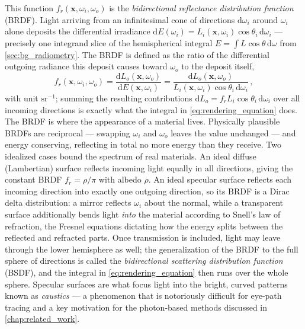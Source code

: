 This function $f_r(\mathbf{x}, \omega_i, \omega_o)$ is the \emph{bidirectional reflectance distribution function} (BRDF). Light arriving from an infinitesimal cone of directions $\mathrm{d}\omega_i$ around $\omega_i$ alone deposits the differential irradiance $\mathrm{d}E(\omega_i) = L_i(\mathbf{x}, \omega_i)\cos\theta_i \,\mathrm{d}\omega_i$ --- precisely one integrand slice of the hemispherical integral $E = \int L\cos\theta \,\mathrm{d}\omega$ from \cref{sec:bg_radiometry}. The BRDF is defined as the ratio of the differential outgoing radiance this deposit causes toward $\omega_o$ to the deposit itself,
\begin{equation}
	f_r(\mathbf{x}, \omega_i, \omega_o) = \frac{\mathrm{d}L_o(\mathbf{x}, \omega_o)}{\mathrm{d}E(\mathbf{x}, \omega_i)} = \frac{\mathrm{d}L_o(\mathbf{x}, \omega_o)}{L_i(\mathbf{x}, \omega_i)\cos\theta_i \,\mathrm{d}\omega_i} \,,
\end{equation}
with unit $\mathrm{sr^{-1}}$; summing the resulting contributions $\mathrm{d}L_o = f_r L_i \cos\theta_i \,\mathrm{d}\omega_i$ over all incoming directions is exactly what the integral in \cref{eq:rendering_equation} does. The BRDF is where the appearance of a material lives. Physically plausible BRDFs are reciprocal --- swapping $\omega_i$ and $\omega_o$ leaves the value unchanged --- and energy conserving, reflecting in total no more energy than they receive. Two idealized cases bound the spectrum of real materials. An ideal diffuse (Lambertian) surface reflects incoming light equally in all directions, giving the constant BRDF $f_r = \rho/\pi$ with albedo $\rho$. An ideal specular surface reflects each incoming direction into exactly one outgoing direction, so its BRDF is a Dirac delta distribution: a mirror reflects $\omega_i$ about the normal, while a transparent surface additionally bends light \emph{into} the material according to Snell's law of refraction, the Fresnel equations dictating how the energy splits between the reflected and refracted parts. Once transmission is included, light may leave through the lower hemisphere as well; the generalization of the BRDF to the full sphere of directions is called the \emph{bidirectional scattering distribution function} (BSDF), and the integral in \cref{eq:rendering_equation} then runs over the whole sphere. Specular surfaces are what focus light into the bright, curved patterns known as \emph{caustics} --- a phenomenon that is notoriously difficult for eye-path tracing and a key motivation for the photon-based methods discussed in \cref{chap:related_work}.

